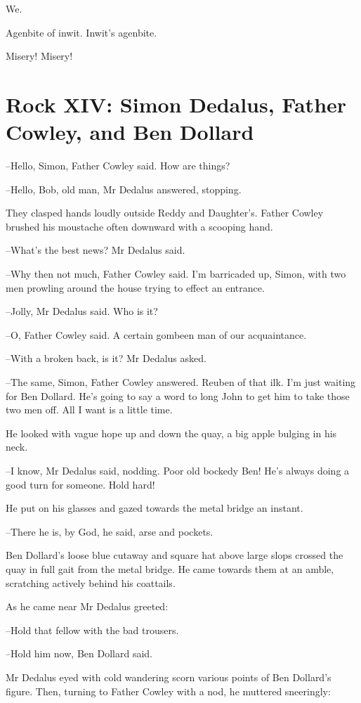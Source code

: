 We.

Agenbite of inwit.
Inwit's agenbite.

Misery!
Misery!


\section*{Rock XIV: Simon Dedalus, Father Cowley, and Ben Dollard}


--Hello, Simon,
Father Cowley said.
How are things?

--Hello, Bob, old man,
Mr Dedalus answered,
stopping.

They clasped hands loudly outside Reddy and Daughter's.
Father Cowley
brushed his moustache often downward
with a scooping hand.

--What's the best news?
Mr Dedalus said.

--Why then not much,
Father Cowley said.
I'm barricaded up, Simon,
with
two men prowling around the house
trying to effect an entrance.

--Jolly,
Mr Dedalus said.
Who is it?

--O,
Father Cowley said.
A certain gombeen man of our acquaintance.

--With a broken back, is it?
Mr Dedalus asked.

--The same, Simon,
Father Cowley answered.
Reuben of that ilk.
I'm just
waiting for Ben Dollard.
He's going to say a word to long John
to get him
to take those two men off.
All I want is a little time.

He looked with vague hope up and down the quay,
a big apple bulging in
his neck.

--I know,
Mr Dedalus said, nodding.
Poor old bockedy Ben!
He's always
doing a good turn for someone.
Hold hard!

He put on his glasses
and gazed towards the metal bridge an instant.

--There he is, by God, he said,
arse and pockets.

Ben Dollard's loose blue cutaway and square hat above large slops
crossed
the quay in full gait
from the metal bridge.
He came towards them at an
amble,
scratching actively behind his coattails.

As he came near
Mr Dedalus greeted:

--Hold that fellow with the bad trousers.

--Hold him now,
Ben Dollard said.

Mr Dedalus eyed with cold wandering scorn
various points of Ben Dollard's
figure.
Then,
turning to Father Cowley with a nod,
he muttered
sneeringly:

